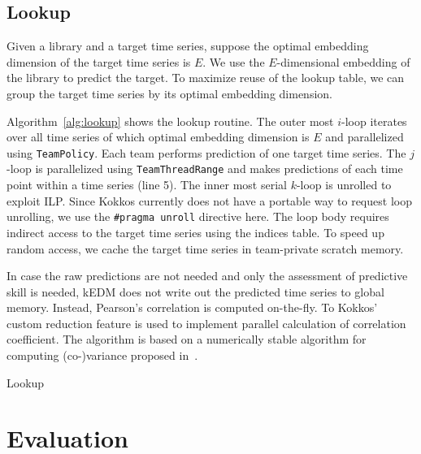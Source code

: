 \documentclass[sigconf]{acmart}
\begin{document}
\subsection{Lookup}

Given a library and a target time series, suppose the optimal embedding
dimension of the target time series is $E$. We use the $E$-dimensional embedding
of the library to predict the target. To maximize reuse of the lookup table, we
can group the target time series by its optimal embedding dimension.

Algorithm~\ref{alg:lookup} shows the lookup routine. The outer most $i$-loop
iterates over all time series of which optimal embedding dimension is $E$ and
parallelized using \texttt{TeamPolicy}. Each team performs prediction of one
target time series. The $j$-loop is parallelized using \texttt{TeamThreadRange}
and makes predictions of each time point within a time series (line 5). The
inner most serial $k$-loop is unrolled to exploit ILP\@. Since Kokkos currently
does not have a portable way to request loop unrolling, we use the
\texttt{\#pragma unroll} directive here. The loop body requires indirect access
to the target time series using the indices table. To speed up random access, we
cache the target time series in team-private scratch memory.

In case the raw predictions are not needed and only the assessment of predictive
skill is needed, kEDM does not write out the predicted time series to global
memory. Instead, Pearson’s correlation is computed on-the-fly. To Kokkos’ custom
reduction feature is used to implement parallel calculation of correlation
coefficient. The algorithm is based on a numerically stable algorithm for
computing (co-)variance proposed in~\cite{Schubert2018}.

\begin{algorithm}
    \SetAlgoLined
    \DontPrintSemicolon
    \caption{Lookup}%
    \label{alg:lookup}
\end{algorithm}

\section{Evaluation}\label{sec:evaluation}
\end{document}
